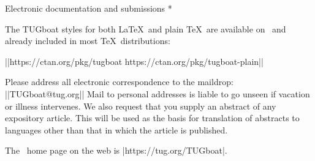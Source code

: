 \head * Electronic documentation and submissions *

The TUGboat styles for both \LaTeX\ and plain \TeX\ are available on
\CTAN\ and already included in most \TeX\ distributions:

||https://ctan.org/pkg/tugboat
https://ctan.org/pkg/tugboat-plain||

Please address all electronic correspondence to the \TUB{} maildrop:
||TUGboat@tug.org||
Mail to personal addresses is liable to go unseen if
vacation or illness intervenes.  We also request that you supply
an abstract of any expository article.  This will be used as the
basis for translation of abstracts to languages other than that
in which the article is published.

\smallskip
The \TUB\ home page on the web is |https://tug.org/TUGboat|.

\makesignature

\endarticle
